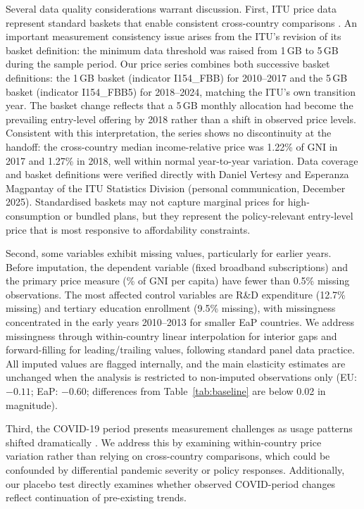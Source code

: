 Several data quality considerations warrant discussion. First, ITU price data represent
standard baskets that enable consistent cross-country comparisons \citep{itu2024data}.
An important measurement consistency issue arises from the ITU's revision of its basket
definition: the minimum data threshold was raised from 1\,GB to 5\,GB during the sample
period. Our price series combines both successive basket definitions: the 1\,GB basket (indicator I154\_FBB) for 2010--2017 and the 5\,GB basket (indicator I154\_FBB5) for 2018--2024, matching the ITU's own transition year. The basket change reflects that a 5\,GB monthly allocation had become the prevailing entry-level offering by 2018 rather than a shift in observed price levels. Consistent with this interpretation, the series shows no discontinuity at the handoff: the cross-country median income-relative price was 1.22\% of GNI in 2017 and 1.27\% in 2018, well within normal year-to-year variation. Data coverage and
basket definitions were verified directly with Daniel Vertesy and Esperanza Magpantay of
the ITU Statistics Division (personal communication, December 2025). Standardised baskets may not
capture marginal prices for high-consumption or bundled plans, but they represent the
policy-relevant entry-level price that is most responsive to affordability constraints.

Second, some variables exhibit missing values, particularly for earlier years.
Before imputation, the dependent variable (fixed broadband subscriptions) and the
primary price measure (\% of GNI per capita) have fewer than 0.5\% missing observations.
The most affected control variables are R\&D expenditure (12.7\% missing) and tertiary
education enrollment (9.5\% missing), with missingness concentrated in the early years
2010--2013 for smaller EaP countries. We address missingness through within-country linear interpolation
for interior gaps and forward-filling for leading/trailing values, following
standard panel data practice. All imputed values are flagged internally, and the
main elasticity estimates are unchanged when the analysis is restricted to non-imputed
observations only (EU: $-0.11$; EaP: $-0.60$; differences from Table~\ref{tab:baseline}
are below 0.02 in magnitude).

Third, the COVID-19 period presents measurement challenges as usage patterns shifted dramatically \citep{oecd2021covid}. We address this by examining within-country price variation rather than relying on cross-country comparisons, which could be confounded by differential pandemic severity or policy responses. Additionally, our placebo test directly examines whether observed COVID-period changes reflect continuation of pre-existing trends.

